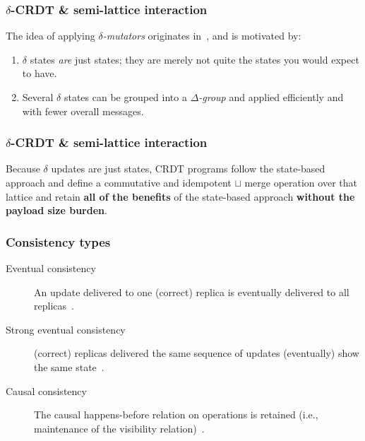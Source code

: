 \documentclass[aspectratio=169,compress]{beamer}
\begin{document}
  \begin{frame}
    \frametitle{$\delta$-CRDT \& semi-lattice interaction}

    The idea of applying \textit{$\delta$-mutators} originates
    in~\cite{almeida16}, and is motivated by:
    \begin{enumerate}
      \item $\delta$ states \textit{are} just states; they are merely not quite
        the states you would expect to have.
      \item Several $\delta$ states can be grouped into a
        \textit{$\Delta$-group} and applied efficiently and with fewer overall
        messages.
    \end{enumerate}
  \end{frame}

  \begin{frame}
    \frametitle{$\delta$-CRDT \& semi-lattice interaction}

    Because $\delta$ updates are just states, CRDT programs follow the
    state-based approach and define a commutative and idempotent $\sqcup$ merge
    operation over that lattice and retain \textbf{all of the benefits} of
    the state-based approach \textbf{without the payload size burden}.
  \end{frame}

  \begin{frame}
    \frametitle{Consistency types}

    \begin{description}
      \item[Eventual consistency] An update delivered to one (correct) replica
        is eventually delivered to all replicas~\citep{shapiro11}.
      \item[Strong eventual consistency] (correct) replicas delivered the same
        sequence of updates (eventually) show the same state~\citep{shapiro11}.
      \item[Causal consistency] The causal happens-before relation on operations
        is retained (i.e., maintenance of the visibility
        relation)~\citep{almeida16}.
    \end{description}
  \end{frame}
\end{document}
